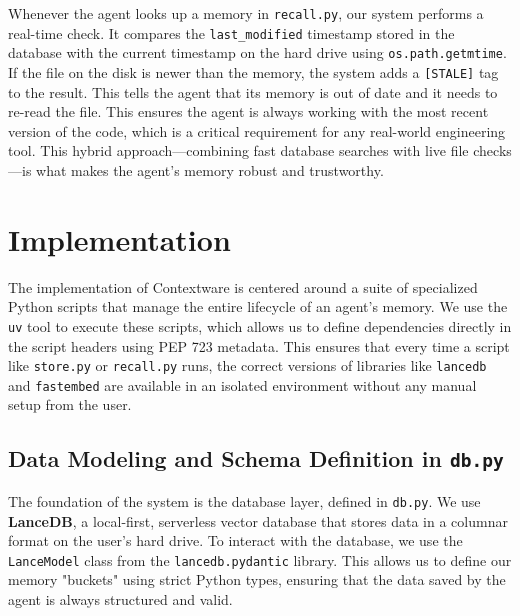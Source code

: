 \documentclass[conference]{IEEEtran}
\begin{document}
Whenever the agent looks up a memory in \texttt{recall.py}, our system performs a real-time check. It compares the \texttt{last\_modified} timestamp stored in the database with the current timestamp on the hard drive using \texttt{os.path.getmtime}. If the file on the disk is newer than the memory, the system adds a \texttt{[STALE]} tag to the result. This tells the agent that its memory is out of date and it needs to re-read the file. This ensures the agent is always working with the most recent version of the code, which is a critical requirement for any real-world engineering tool. This hybrid approach—combining fast database searches with live file checks—is what makes the agent's memory robust and trustworthy.

\section{Implementation}

The implementation of Contextware is centered around a suite of specialized Python scripts that manage the entire lifecycle of an agent's memory. We use the \texttt{uv} tool to execute these scripts, which allows us to define dependencies directly in the script headers using PEP 723 metadata. This ensures that every time a script like \texttt{store.py} or \texttt{recall.py} runs, the correct versions of libraries like \texttt{lancedb} and \texttt{fastembed} are available in an isolated environment without any manual setup from the user.

\subsection{Data Modeling and Schema Definition in \texttt{db.py}} The foundation of the system is the database layer, defined in \texttt{db.py}. We use \textbf{LanceDB}, a local-first, serverless vector database that stores data in a columnar format on the user's hard drive. To interact with the database, we use the \texttt{LanceModel} class from the \texttt{lancedb.pydantic} library. This allows us to define our memory "buckets" using strict Python types, ensuring that the data saved by the agent is always structured and valid.
\end{document}
